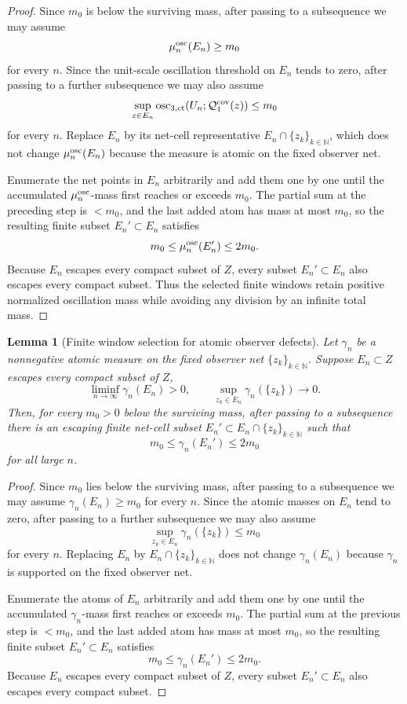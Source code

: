 \documentclass[11pt]{amsart}
\numberwithin{equation}{section}
\theoremstyle{plain}
\newtheorem{lemma}[lemma]{Lemma}
\theoremstyle{definition}
\theoremstyle{remark}
\newcommand{\actthree}{\operatorname{osc}_{3,\mathrm{ct}}}
\begin{document}
\begin{proof}
Since \(m_0\) is below the surviving mass, after passing to a subsequence we
may assume
\[
   \mu_n^{\rm osc}(E_n)\ge m_0
\]
for every \(n\).  Since the unit-scale oscillation threshold on \(E_n\) tends
to zero, after passing to a further subsequence we may also assume
\[
   \sup_{z\in E_n}\actthree(U_n;\mathcal Q_1^{\rm cov}(z))\le m_0
\]
for every \(n\).  Replace \(E_n\) by its net-cell representative
\(E_n\cap\{z_k\}_{k\in\mathbb N}\), which does not change
\(\mu_n^{\rm osc}(E_n)\) because the measure is atomic on the fixed observer net.

Enumerate the net points in \(E_n\) arbitrarily and add them one by one until
the accumulated \(\mu_n^{\rm osc}\)-mass first reaches or exceeds \(m_0\).  The
partial sum at the preceding step is \(<m_0\), and the last added atom has mass
at most \(m_0\), so the resulting finite subset \(E_n'\subset E_n\) satisfies
\[
   m_0\le \mu_n^{\rm osc}(E_n')\le 2m_0 .
\]
Because \(E_n\) escapes every compact subset of \(Z\), every subset
\(E_n'\subset E_n\) also escapes every compact subset.  Thus the selected
finite windows retain positive normalized oscillation mass while avoiding any
division by an infinite total mass.
\end{proof}

\begin{lemma}[Finite window selection for atomic observer defects]
\label{lem:finite-atomic-observer-window-selection}
Let \(\gamma_n\) be a nonnegative atomic measure on the fixed observer net
\(\{z_k\}_{k\in\mathbb N}\).  Suppose \(E_n\subset Z\) escapes every compact
subset of \(Z\),
\[
   \liminf_{n\to\infty}\gamma_n(E_n)>0,
   \qquad
   \sup_{z_k\in E_n}\gamma_n(\{z_k\})\to0 .
\]
Then, for every \(m_0>0\) below the surviving mass, after passing to a
subsequence there is an escaping finite net-cell subset
\(E_n'\subset E_n\cap\{z_k\}_{k\in\mathbb N}\) such that
\[
   m_0\le \gamma_n(E_n')\le 2m_0
\]
for all large \(n\).
\end{lemma}

\begin{proof}
Since \(m_0\) lies below the surviving mass, after passing to a subsequence we
may assume \(\gamma_n(E_n)\ge m_0\) for every \(n\).  Since the atomic masses
on \(E_n\) tend to zero, after passing to a further subsequence we may also
assume
\[
   \sup_{z_k\in E_n}\gamma_n(\{z_k\})\le m_0
\]
for every \(n\).  Replacing \(E_n\) by \(E_n\cap\{z_k\}_{k\in\mathbb N}\) does
not change \(\gamma_n(E_n)\) because \(\gamma_n\) is supported on the fixed
observer net.

Enumerate the atoms of \(E_n\) arbitrarily and add them one by one until the
accumulated \(\gamma_n\)-mass first reaches or exceeds \(m_0\).  The partial
sum at the previous step is \(<m_0\), and the last added atom has mass at most
\(m_0\), so the resulting finite subset \(E_n'\subset E_n\) satisfies
\[
   m_0\le \gamma_n(E_n')\le 2m_0 .
\]
Because \(E_n\) escapes every compact subset of \(Z\), every subset
\(E_n'\subset E_n\) also escapes every compact subset.
\end{proof}
\end{document}
